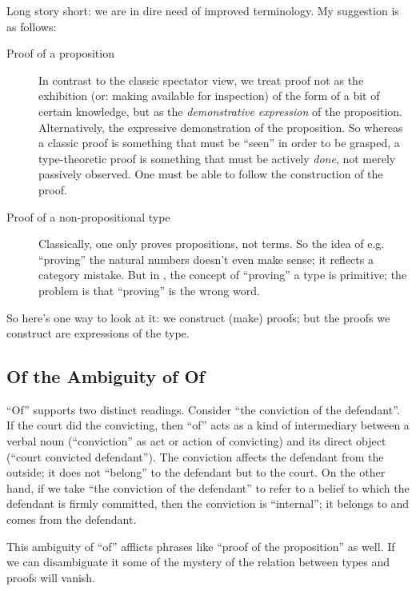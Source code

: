 Long story short: we are in dire need of improved terminology.  My
suggestion is as follows:

\begin{description}
\item [Proof of a proposition] In contrast to the classic spectator
  view, we treat proof not as the exhibition (or: making available for
  inspection) of the form of a bit of certain knowledge, but as the
  \textit{demonstrative expression} of the proposition.
  Alternatively, the expressive demonstration of the proposition.  So
  whereas a classic proof is something that must be ``seen'' in order
  to be grasped, a type-theoretic proof is something that must be
  actively \textit{done}, not merely passively observed.  One must be
  able to follow the construction of the proof.

\item [Proof of a non-propositional type] Classically, one only proves
  propositions, not terms.  So the idea of e.g. ``proving'' the
  natural numbers doesn't even make sense; it reflects a category
  mistake.  But in \HoTT, the concept of ``proving'' a type is
  primitive; the problem is that ``proving'' is the wrong word.  
\end{description}

So here's one way to look at it: we construct (make) proofs; but the
proofs we construct are expressions of the type.

\subsection{Of the Ambiguity of Of}
\label{subs:ofofof}

``Of'' supports two distinct readings.  Consider ``the conviction of
the defendant''.  If the court did the convicting, then ``of'' acts as
a kind of intermediary between a verbal noun (``conviction'' as act or
action of convicting) and its direct object (``court convicted
defendant'').  The conviction affects the defendant from the outside;
it does not ``belong'' to the defendant but to the court.  On the
other hand, if we take ``the conviction of the defendant'' to refer to
a belief to which the defendant is firmly committed, then the
conviction is ``internal''; it belongs to and comes from the
defendant.

This ambiguity of ``of'' afflicts phrases like ``proof of the
proposition'' as well.  If we can disambiguate it some of the mystery
of the relation between types and proofs will vanish.

